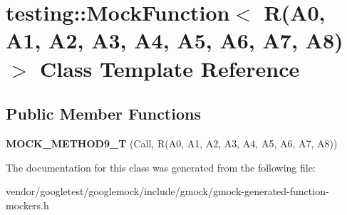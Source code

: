 \hypertarget{classtesting_1_1_mock_function_3_01_r_07_a0_00_01_a1_00_01_a2_00_01_a3_00_01_a4_00_01_a5_00_01_a6_00_01_a7_00_01_a8_08_4}{}\section{testing\+:\+:Mock\+Function$<$ R(A0, A1, A2, A3, A4, A5, A6, A7, A8)$>$ Class Template Reference}
\label{classtesting_1_1_mock_function_3_01_r_07_a0_00_01_a1_00_01_a2_00_01_a3_00_01_a4_00_01_a5_00_01_a6_00_01_a7_00_01_a8_08_4}
\subsection*{Public Member Functions}
\begin{DoxyCompactItemize}
\item 
\mbox{\label{classtesting_1_1_mock_function_3_01_r_07_a0_00_01_a1_00_01_a2_00_01_a3_00_01_a4_00_01_a5_00_01_a6_00_01_a7_00_01_a8_08_4_a0fee6ada67063cc8ec8b2181021f0195}} 
{\bfseries M\+O\+C\+K\+\_\+\+M\+E\+T\+H\+O\+D9\+\_\+T} (Call, R(A0, A1, A2, A3, A4, A5, A6, A7, A8))
\end{DoxyCompactItemize}


The documentation for this class was generated from the following file\+:\begin{DoxyCompactItemize}
\item 
vendor/googletest/googlemock/include/gmock/gmock-\/generated-\/function-\/mockers.\+h\end{DoxyCompactItemize}
